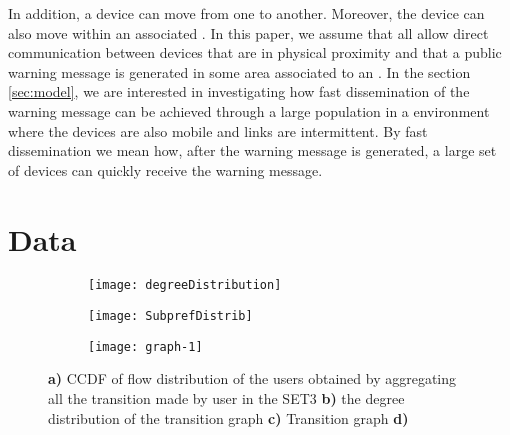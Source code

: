 \documentclass[review]{elsarticle}
\begin{document}
In addition, a device can move from one  to another. Moreover, the device can also move within an associated . In this paper, we assume that all  allow direct communication between devices that are in physical proximity and that a public warning message is generated in some area associated to an . In the section \ref{sec:model}, we are interested in investigating how fast dissemination of the warning message can be achieved through a large population in a  environment where the devices are also mobile and links are intermittent. By fast dissemination we mean how, after the warning message is generated, a large set of devices can quickly receive the warning message.

\section{Data}\label{sec:C3_Data Analysis}
\captionsetup[subfigure]{labelformat=empty}
\begin{figure*}\centering
    \begin{subfigure}[b]{0.35\textwidth}
         \texttt{[image: degreeDistribution]}
	\caption{}
	\label{fig:distributiona}
    \end{subfigure}	
    \begin{subfigure}[b]{0.35\textwidth}
         \texttt{[image: SubprefDistrib]}
         \caption{}
	\label{fig:distributionb}
    \end{subfigure}
    \begin{subfigure}[b]{0.28\textwidth}
         \texttt{[image: graph-1]}
         \caption{}
	\label{fig:graph}
    \end{subfigure}
    \caption{\textbf{a)} CCDF of flow distribution of the users obtained by aggregating all the transition made by user in the SET3 \textbf{b)} the degree distribution of the transition graph \textbf{c)} Transition graph \textbf{d)}}
    \label{fig:distribution}
\end{figure*}
\end{document}
